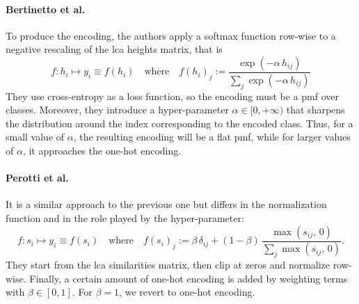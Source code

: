 \paragraph{Bertinetto et al.~\cite{MakingBetterMBertin2019}}\label{par:encoding-mbm} To produce the encoding, the authors apply a softmax function row-wise to a negative rescaling of the \acrshort{lca} heights matrix, that is
\begin{equation}
  f : h_i \mapsto y_i \equiv f(h_i)
  \quad \textrm{where} \quad
  f (h_i)_j := \frac{\exp \left({-\alpha \, h_{ij}}\right)}
  {\sum_j \exp\left({-\alpha \, h_{ij}}\right)}
  \label{eq:mbm-hierarchical-encoding}
\end{equation}
They use cross-entropy as a loss function, so the encoding must be a \acrshort{pmf} over classes.
Moreover, they introduce a hyper-parameter $\alpha \in [0, +\infty)$ that sharpens the distribution around the index corresponding to the encoded class. Thus, for a small value of $\alpha$, the resulting encoding will be a flat \acrshort{pmf}, while for larger values of $\alpha$, it approaches the one-hot encoding.

\paragraph{Perotti et al.~\cite{BeyondOneHotPerott2023}}\label{par:encoding-b3p} It is a similar approach to the previous one but differs in the normalization function and in the role played by the hyper-parameter:
\begin{equation}
  f :  s_i \mapsto y_i \equiv f(s_i)
  \quad \textrm{where} \quad
  f (s_i)_j := \beta \, \delta_{ij} +
  \left(1 - \beta \right) \, \frac{\max \left(s_{ij},\,0\right)}
  {\sum_j \max \left(s_{ij},\,0\right)}.
  \label{eq:b3p-hierarchical-encoding}
\end{equation}
They start from the \acrshort{lca} similarities matrix, then clip at zeros and normalize row-wise.
Finally, a certain amount of one-hot encoding is added by weighting terms with $\beta \in [0, 1]$. For $\beta = 1$, we revert to one-hot encoding.

